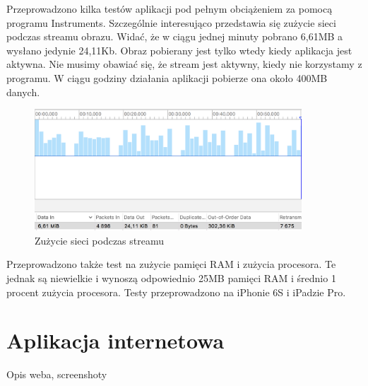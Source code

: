 Przeprowadzono kilka testów aplikacji pod pełnym obciążeniem za pomocą programu Instruments. Szczególnie interesująco przedstawia się zużycie sieci podczas streamu obrazu. Widać, że w ciągu jednej minuty pobrano 6,61MB a wysłano jedynie 24,11Kb. Obraz pobierany jest tylko wtedy kiedy aplikacja jest aktywna. Nie musimy obawiać się, że stream jest aktywny, kiedy nie korzystamy z programu. W ciągu godziny działania aplikacji pobierze ona około 400MB danych.

\begin{figure}[h]
	\centering
	\includegraphics[width=10cm]{networkUsage}
	\caption{Zużycie sieci podczas streamu}
\end{figure}

Przeprowadzono także test na zużycie pamięci RAM i zużycia procesora. Te jednak są niewielkie i wynoszą odpowiednio 25MB pamięci RAM i średnio 1 procent zużycia procesora.
Testy przeprowadzono na iPhonie 6S i iPadzie Pro.




\section*{Aplikacja internetowa}

Opis weba, screenshoty